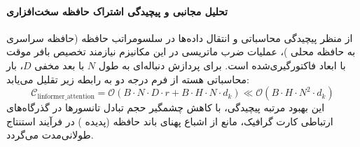 \paragraph{تحلیل مجانبی و پیچیدگی اشتراک حافظه سخت‌افزاری}
از منظر پیچیدگی محاسباتی و انتقال داده‌ها در سلسومراتب حافظه (حافظه سراسری  به حافظه محلی )، عملیات ضرب ماتریسی در این مکانیزم نیازمند تخصیص بافر موقت با ابعاد فاکتورگیری‌شده است. برای پردازش دنباله‌ای به طول $N$ با بعد مخفی $D$، بار محاسباتی هسته از فرم درجه دو به رابطه زیر تقلیل می‌یابد:
\begin{equation}
\label{eq:complexity_linformer_attention}
\mathcal{C}_{\text{linformer\_attention}} = \mathcal{O}\left( B \cdot N \cdot D \cdot r + B \cdot H \cdot N \cdot d_k \right) \ll \mathcal{O}\left( B \cdot H \cdot N^2 \cdot d_k \right)
\end{equation}
این بهبود مرتبه پیچیدگی، با کاهش چشمگیر حجم تبادل تانسورها در گذرگاه‌های ارتباطی کارت گرافیک، مانع از اشباع پهنای باند حافظه (پدیده ) در فرآیند استنتاج طولانی‌مدت می‌گردد.